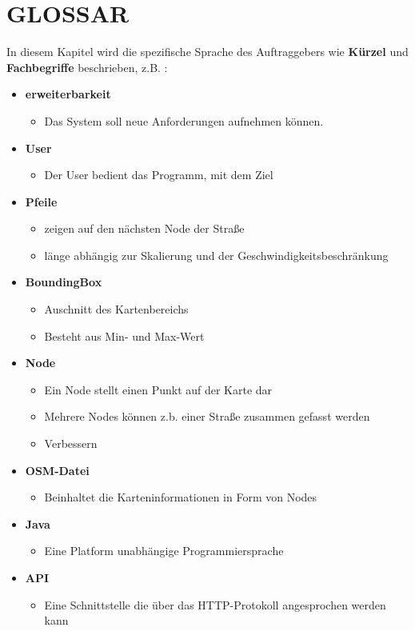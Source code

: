 	\section{\Large GLOSSAR}
	In diesem Kapitel wird die spezifische Sprache des Auftraggebers wie \textbf{ Kürzel } und \textbf{ Fachbegriffe } beschrieben, z.B. :
	\begin{itemize}
		\item \textbf{ erweiterbarkeit }
		\begin{itemize}
			\item  Das System soll neue Anforderungen aufnehmen können.
		\end{itemize}
		\item \textbf{ User }
		\begin{itemize}
			\item Der User bedient das Programm, mit dem Ziel 
		\end{itemize}
		\item \textbf{ Pfeile }
		\begin{itemize}
			\item zeigen auf den nächsten Node der Straße
			\item länge abhängig zur Skalierung und der Geschwindigkeitsbeschränkung
		\end{itemize}
		\item \textbf{ BoundingBox }
		\begin{itemize}
			\item Auschnitt des Kartenbereichs
			\item Besteht aus Min- und Max-Wert
		\end{itemize}
		\item \textbf{ Node }
		\begin{itemize}
			\item Ein Node stellt einen Punkt auf der Karte dar
			\item Mehrere Nodes können z.b. einer Straße zusammen gefasst werden
			\item Verbessern
		\end{itemize}
		\item \textbf{ OSM-Datei }
		\begin{itemize}
			\item Beinhaltet die Karteninformationen in Form von Nodes 
		\end{itemize}
		\item \textbf{ Java }
		\begin{itemize}
			\item Eine Platform unabhängige Programmiersprache 
		\end{itemize}
		\item \textbf{ API }
		\begin{itemize}
			\item Eine Schnittstelle die über das HTTP-Protokoll angesprochen werden kann 
		\end{itemize}
	\end{itemize}

		